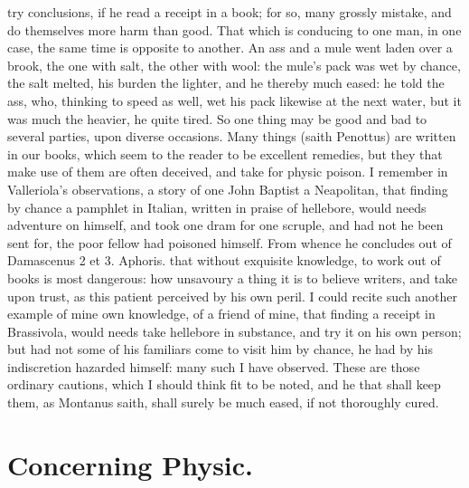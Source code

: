 {try conclusions, if he read a receipt in a book; for so, many grossly
mistake, and do themselves more harm than good. That which is conducing
to one man, in one case, the same time is opposite to another. An
ass and a mule went laden over a brook, the one with salt, the other
with wool: the mule's pack was wet by chance, the salt melted, his
burden the lighter, and he thereby much eased: he told the ass, who,
thinking to speed as well, wet his pack likewise at the next water, but
it was much the heavier, he quite tired. So one thing may be good and
bad to several parties, upon diverse occasions. Many things (saith
 Penottus) are written in our books, which seem to the reader to
be excellent remedies, but they that make use of them are often
deceived, and take for physic poison. I remember in Valleriola's
observations, a story of one John Baptist a Neapolitan, that finding by
chance a pamphlet in Italian, written in praise of hellebore, would
needs adventure on himself, and took one dram for one scruple, and had
not he been sent for, the poor fellow had poisoned himself. From whence
he concludes out of Damascenus 2 et 3. Aphoris. that without
exquisite knowledge, to work out of books is most dangerous: how
unsavoury a thing it is to believe writers, and take upon trust, as
this patient perceived by his own peril. I could recite such another
example of mine own knowledge, of a friend of mine, that finding a
receipt in Brassivola, would needs take hellebore in substance, and try
it on his own person; but had not some of his familiars come to visit
him by chance, he had by his indiscretion hazarded himself: many such I
have observed. These are those ordinary cautions, which I should think
fit to be noted, and he that shall keep them, as  Montanus saith,
shall surely be much eased, if not thoroughly cured.

\section{Concerning Physic.}

}
